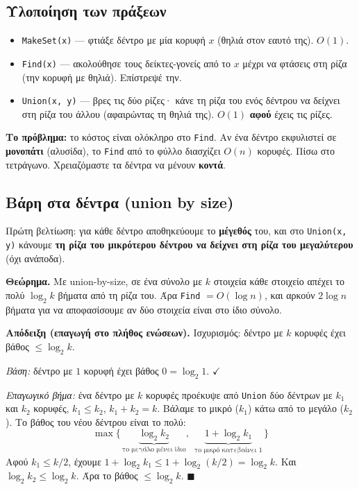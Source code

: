 \documentclass[11pt,a4paper]{article}
\begin{document}
\subsection{Υλοποίηση των πράξεων}

\begin{itemize}
  \item \texttt{MakeSet(x)} --- φτιάξε δέντρο με μία κορυφή $x$ (θηλιά στον
  εαυτό της). $O(1)$.
  \item \texttt{Find(x)} --- ακολούθησε τους δείκτες-γονείς από το $x$ μέχρι να
  φτάσεις στη ρίζα (την κορυφή με θηλιά). Επίστρεψέ την.
  \item \texttt{Union(x, y)} --- βρες τις δύο ρίζες· κάνε τη ρίζα του ενός
  δέντρου να δείχνει στη ρίζα του άλλου (αφαιρώντας τη θηλιά της). $O(1)$
  \textbf{αφού} έχεις τις ρίζες.
\end{itemize}

\begin{warningbox}
\textbf{Το πρόβλημα:} το κόστος είναι ολόκληρο στο \texttt{Find}. Αν ένα δέντρο
εκφυλιστεί σε \textbf{μονοπάτι} (αλυσίδα), το \texttt{Find} από το φύλλο
διασχίζει $O(n)$ κορυφές. Πίσω στο τετράγωνο. Χρειαζόμαστε τα δέντρα να μένουν
\textbf{κοντά}.
\end{warningbox}

\subsection{Βάρη στα δέντρα (union by size)}

Πρώτη βελτίωση: για κάθε δέντρο αποθηκεύουμε το \textbf{μέγεθός} του, και στο
\texttt{Union(x, y)} κάνουμε \textbf{τη ρίζα του μικρότερου δέντρου να δείχνει
στη ρίζα του μεγαλύτερου} (όχι ανάποδα).

\begin{keypoint}
\textbf{Θεώρημα.} Με union-by-size, σε ένα σύνολο με $k$ στοιχεία κάθε στοιχείο
απέχει το πολύ $\log_2 k$ βήματα από τη ρίζα του. Άρα \texttt{Find} $=
O(\log n)$, και αρκούν $2\log n$ βήματα για να αποφασίσουμε αν δύο στοιχεία είναι
στο ίδιο σύνολο.
\end{keypoint}

\textbf{Απόδειξη (επαγωγή στο πλήθος ενώσεων).} Ισχυρισμός: δέντρο με $k$ κορυφές
έχει βάθος $\le \log_2 k$.

\textit{Βάση:} δέντρο με $1$ κορυφή έχει βάθος $0 = \log_2 1$. $\checkmark$

\textit{Επαγωγικό βήμα:} ένα δέντρο με $k$ κορυφές προέκυψε από \texttt{Union}
δύο δέντρων με $k_1$ και $k_2$ κορυφές, $k_1 \le k_2$, $k_1 + k_2 = k$. Βάλαμε το
μικρό ($k_1$) κάτω από το μεγάλο ($k_2$). Το βάθος του νέου δέντρου είναι το
πολύ:
\[
\max\bigl\{\, \underbrace{\log_2 k_2}_{\text{το μεγάλο μένει ίδιο}},\ \
\underbrace{1 + \log_2 k_1}_{\text{το μικρό κατεβαίνει 1}} \,\bigr\}
\]
Αφού $k_1 \le k/2$, έχουμε $1 + \log_2 k_1 \le 1 + \log_2(k/2) = \log_2 k$. Και
$\log_2 k_2 \le \log_2 k$. Άρα το βάθος $\le \log_2 k$. $\blacksquare$
\end{document}
